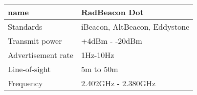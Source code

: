 \begin{tabular}{|l|l|}
\hline
name	             & RadBeacon Dot                 \\ \hline
Standards          & iBeacon, AltBeacon, Eddystone \\ \hline
Transmit power     & +4dBm - -20dBm                \\ \hline
Advertisement rate & 1Hz-10Hz                      \\ \hline
Line-of-sight			 & 5m to 50m										 \\ \hline
Frequency	 				 & 2.402GHz - 2.380GHz						 \\ \hline
\end{tabular}
